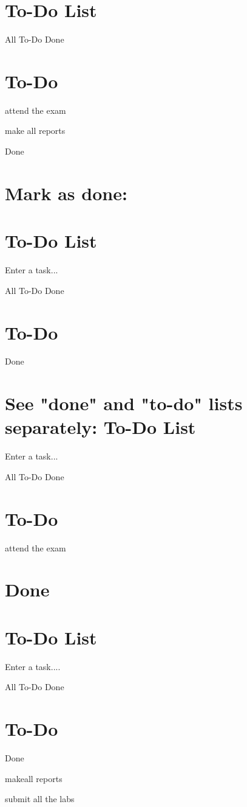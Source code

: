 \documentclass[10pt]{article}
\begin{document}
\section{To-Do List}
All To-Do Done

\section{To-Do}
attend the exam

make all reports

Done

\section{Mark as done:}
\section{To-Do List}
Enter a task...

All To-Do Done

\section{To-Do}
Done

\section{See "done" and "to-do" lists separately:
To-Do List}
Enter a task...

All To-Do Done

\section{To-Do}
attend the exam

\section{Done}
\section{To-Do List}
Enter a task....

All To-Do Done

\section{To-Do}
Done

makeall reports

submit all the labs
\end{document}

